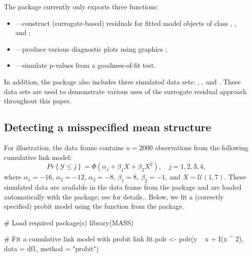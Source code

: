 The  package currently only exports three functions:
\begin{itemize}
  \item {}---construct (surrogate-based) residuals for fitted model objects of class , , and ;
  \item {}---produce various diagnostic plots using  graphics \citep{pkg-ggplot2};
 \item {}---simulate p-values from a goodness-of-fit test.
\end{itemize}
In addition, the package also includes three simulated data sets: , , and . These data sets are used to demonstrate various uses of the surrogate residual approach throughout this paper.


\subsection{Detecting a misspecified mean structure}

For illustration, the data frame  contains $n = 2000$ observations from the following cumulative link model:
\begin{equation}
\label{eqn:quadratic}
  Pr\left\{\mathcal{Y} \le j\right\} = \Phi\left(\alpha_j + \beta_1 X + \beta_2 X ^ 2\right), \quad j = 1, 2, 3, 4,
\end{equation}
where $\alpha_1 = -16$, $\alpha_2 = -12$, $\alpha_3 = -8$, $\beta_1 = 8$, $\beta_2 = -1$, and $X \sim \mathcal{U}\left(1, 7\right)$. These simulated data are available in the  data frame from the  package and are loaded automatically with the package; see  for details.. Below, we fit a (correctly specified) probit model using the  function from the  package.
\begin{example}
# Load required package(s)
library(MASS)

# Fit a cumulative link model with probit link
fit.polr <- polr(y ~ x + I(x ^ 2), data = df1, method = "probit")
\end{example}

